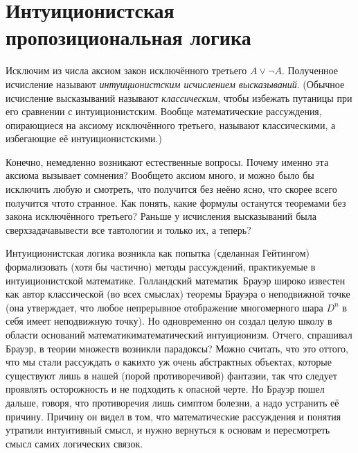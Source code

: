    \section[Интуиционистская пропозициональная логика]
           {Интуиционистская пропозициональная логика}
        \label{intuitionism}

Исключим из числа аксиом закон исключённого третьего
${A\lor\lnot A}$. Полученное исчисление называют
\emph{интуиционистским исчислением высказываний}.%
%
(Обычное
исчисление высказываний называют \emph{классическим},%
%
чтобы
избежать путаницы при его сравнении с интуиционистским. Вообще
математические рассуждения, опирающиеся на аксиому исключённого
третьего, называют  классическими, а избегающие её\т 
интуиционистскими.)

Конечно, немедленно возникают естественные вопросы. Почему именно
эта аксиома вызывает сомнения? Вообще\д то аксиом много, и можно
было бы исключить любую и смотреть, что получится без неё\т но
ясно, что скорее всего получится что\д то странное. Как понять,
какие формулы останутся теоремами без закона исключённого
третьего? Раньше у исчисления высказываний была 
сверхзадача\т вывести все тавтологии и только их, а
теперь?

Интуиционистская логика возникла как попытка
(сделанная Гейтингом)%
формализовать (хотя бы частично) методы
рассуждений, практикуемые в  интуиционистской математике.
Голландский математик~Брауэр%
широко известен как автор
классической (во всех смыслах) теоремы Брауэра о неподвижной
точке%
(она утверждает, что любое непрерывное отображение
многомерного шара $D^n$ в себя имеет неподвижную точку). Но
одновременно он создал целую школу в области оснований
математики\т математический интуиционизм. Отчего, спрашивал
Брауэр, в теории множеств возникли парадоксы? Можно считать, что
это оттого, что мы стали рассуждать о каких\д то уж очень
абстрактных объектах, которые существуют лишь в нашей (порой
противоречивой) фантазии, так что следует проявлять осторожность
и не подходить к опасной черте. Но Брауэр пошел дальше, говоря,
что противоречия лишь симптом болезни, а надо устранить её
причину. Причину он видел в том, что математические рассуждения
и понятия утратили интуитивный смысл, и нужно вернуться к
основам и пересмотреть смысл самих логических связок.

